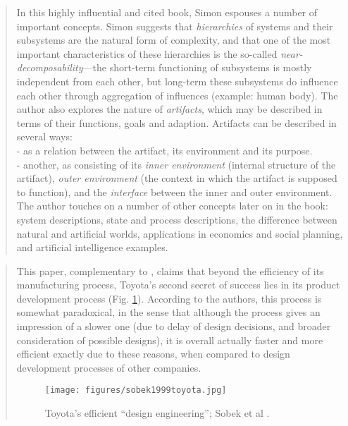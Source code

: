 		\begin{quote}
		\small
		In this highly influential and cited book, Simon espouses a number of important concepts.
		Simon suggests that {\em hierarchies} of systems and their subsystems are the 
		natural form of complexity,
		and that one of the most important characteristics of these hierarchies is the so-called 
		{\em near-decomposability}---the short-term functioning of subsystems is mostly 
		independent from each other, but long-term these subsystems do influence each other through 
		aggregation of influences (example: human body). The author also explores the nature
		of {\em artifacts}, which may be described in terms of their functions, goals and adaption.
		Artifacts can be described in several ways:\\
		- as a relation between the artifact, its environment and its purpose.\\
		- another, as consisting of its {\em inner environment} (internal structure of the artifact), 
		{\em outer environment} (the context in which the artifact is supposed to function), and 
		the {\em interface} between the inner and outer environment.\\
		The author touches on a number of other concepts later on in the book: system
		descriptions, state and process descriptions, the difference between natural and
		artificial worlds, applications in economics and social planning, and artificial intelligence examples. 
		\end{quote}
		
		
		\begin{quote}
		\small
		This paper, complementary to \cite{ward1995second}, claims that beyond the efficiency 
		of its manufacturing process, Toyota's second secret of success lies in its product
		development process (Fig. \ref{fig:sobek1999toyota}). 
		According to the authors, this process is somewhat paradoxical, 
		in the sense that although the process gives an impression of a slower one
		(due to delay of design decisions, and broader consideration of possible designs),
		it is overall actually faster and more efficient exactly due to these reasons, 
		when compared to design development
		processes of other companies.
		\begin{figure}[htb]
		\begin{center}
		\texttt{[image: figures/sobek1999toyota.jpg]}
		\caption{Toyota's efficient ``design engineering''; Sobek et al \cite{sobek1999toyota}.}
		\label{fig:sobek1999toyota}
		\end{center}
		\end{figure}		
		\end{quote}

